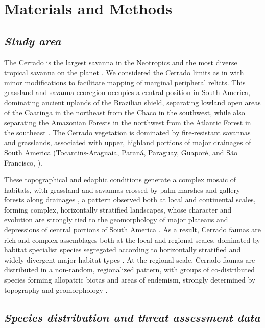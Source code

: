 \documentclass[12pt,openright,oneside,a4paper,english]{abntex2}
\begin{document}
\section{Materials and Methods}
\subsection{\textit{Study area}}

The Cerrado is the largest savanna in the Neotropics and the most diverse tropical savanna on the planet \citep{Ratter1997, KlinkMachado2005}. We considered the Cerrado limits as in \citet{Dinerstein2017} with minor modifications to facilitate mapping of marginal peripheral relicts. This grassland and savanna ecoregion occupies a central position in South America, dominating ancient uplands of the Brazilian shield, separating lowland open areas of the Caatinga in the northeast from the Chaco in the southwest, while also separating the Amazonian Forests in the northwest from the Atlantic Forest in the southeast \citep{Silva2002}. The Cerrado vegetation is dominated by fire-resistant savannas and grasslands, associated with upper, highland portions of major drainages of South America (Tocantins-Araguaia, Paraná, Paraguay, Guaporé, and São Francisco, \citealp{Absaber1998}). 

These topographical and edaphic conditions generate a complex mosaic of habitats, with grassland and savannas crossed by palm marshes and gallery forests along drainages \citep{Eiten1972, Ratter1997}, a pattern observed both at local and continental scales, forming complex, horizontally stratified landscapes, whose character and evolution are strongly tied to the geomorphology of major plateaus and depressions of central portions of South America \citep{Silva2002, Colli2020}. As a result, Cerrado faunas are rich and complex assemblages both at the local and regional scales, dominated by habitat specialist species segregated according to horizontally stratified and widely divergent major habitat types \citep{Silva1997, Silva2002, Nogueira2009, Carmignotto2022}. At the regional scale, Cerrado faunas are distributed in a non-random, regionalized pattern, with groups of co-distributed species forming allopatric biotas and areas of endemism, strongly determined by topography and geomorphology \citep{Silva2002, Nogueira2011, Valdujo2012, Azevedo2016}.

\subsection{\textit{Species distribution and threat assessment data}}
\end{document}
